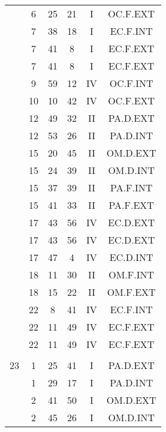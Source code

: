 \documentclass[12pt, a4paper]{article}
\begin{document}
\begin{multicols}{3}
{\begin{tabular}{c c c c c c}
	 	 	 	 & 6 & 25 & 21 & I & OC.F.EXT\\%
	 	 	 	 & 7 & 38 & 18 & I & EC.F.INT\\%
	 	 	 	 & 7 & 41 & 8 & I & EC.F.EXT\\%
	 	 	 	 & 7 & 41 & 8 & I & EC.F.EXT\\%
	 	 	 	 & 9 & 59 & 12 & IV & OC.F.INT\\%
	 	 	 	 & 10 & 10 & 42 & IV & OC.F.EXT\\%
	 	 	 	 & 12 & 49 & 32 & II & PA.D.EXT\\%
	 	 	 	 & 12 & 53 & 26 & II & PA.D.INT\\%
	 	 	 	 & 15 & 20 & 45 & II & OM.D.EXT\\%
	 	 	 	 & 15 & 24 & 39 & II & OM.D.INT\\%
	 	 	 	 & 15 & 37 & 39 & II & PA.F.INT\\%
	 	 	 	 & 15 & 41 & 33 & II & PA.F.EXT\\%
	 	 	 	 & 17 & 43 & 56 & IV & EC.D.EXT\\%
	 	 	 	 & 17 & 43 & 56 & IV & EC.D.EXT\\%
	 	 	 	 & 17 & 47 & 4 & IV & EC.D.INT\\%
	 	 	 	 & 18 & 11 & 30 & II & OM.F.INT\\%
	 	 	 	 & 18 & 15 & 22 & II & OM.F.EXT\\%
	 	 	 	 & 22 & 8 & 41 & IV & EC.F.INT\\%
	 	 	 	 & 22 & 11 & 49 & IV & EC.F.EXT\\%
	 	 	 	 & 22 & 11 & 49 & IV & EC.F.EXT\\%
	 	 	 	 & & & & & \\%
	 	 	 	23 & 1 & 25 & 41 & I & PA.D.EXT\\%
	 	 	 	 & 1 & 29 & 17 & I & PA.D.INT\\%
	 	 	 	 & 2 & 41 & 50 & I & OM.D.EXT\\%
	 	 	 	 & 2 & 45 & 26 & I & OM.D.INT\\%
	 	 \end{tabular}
 	}
\end{multicols}
\end{document}
